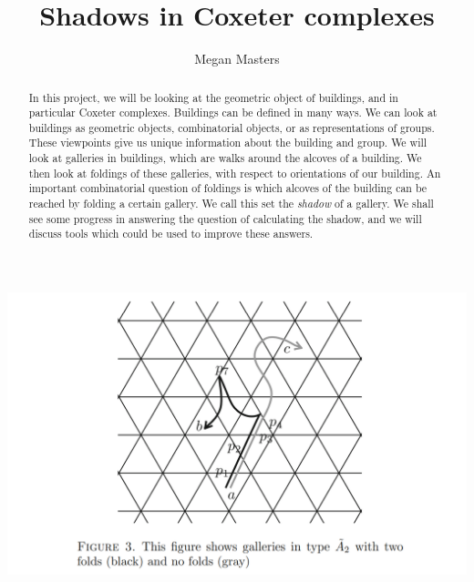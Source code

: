 \documentclass[11pt]{article}
\begin{document}
\newtheorem{theorem}{Theorem}
\theoremstyle{definition}
\newtheorem{definition}{Definition}
\newtheorem{proposition}{Proposition}
\newtheorem{example}{Example}
\newtheorem{lemma}{Lemma}
\newtheorem{corollary}{Corollary}
\newcommand{\uw}{\mathcal{U}(W,X)}
\newcommand{\W}{$(W,S)$}
\newcommand{\ix}{\textit}
\newcommand{\tr}{\textcolor{red}}
\newcommand{\sg}{$\Sigma$}


\title{Shadows in Coxeter complexes}
\author{Megan Masters}
\maketitle



\begin{abstract}
    


In this project, we will be looking at the geometric object of buildings, and in particular Coxeter complexes. Buildings can be defined in many ways. We can look at buildings as geometric objects, combinatorial objects, or as representations of groups. These viewpoints give us unique information about the building and group. We will look at galleries in buildings, which are walks around the alcoves of a building. We then look at foldings of these galleries, with respect to orientations of our building. An important combinatorial question of foldings is which alcoves of the building can be reached by folding a certain gallery. We call this set the \ix{shadow} of a gallery. We shall see some progress in answering the question of calculating the shadow, and we will discuss tools which could be used to improve these answers. 

\end{abstract}
\begin{center}
    \includegraphics[scale=0.6]{Screenshot 2023-02-03 111653.png}\\
\end{center}
\newpage
\tableofcontents
\newpage
{}
\end{document}
